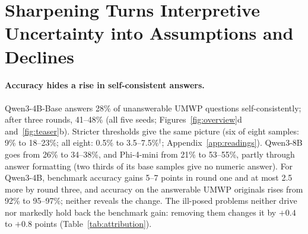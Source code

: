 \section{Sharpening Turns Interpretive Uncertainty into Assumptions and Declines}
\label{sec:accommodation}

\paragraph{Accuracy hides a rise in self-consistent answers.} Qwen3-4B-Base answers 28\% of unanswerable UMWP questions self-consistently; after three rounds, 41--48\% (all five seeds; Figures~\ref{fig:overview}d and~\ref{fig:teaser}b). Stricter thresholds give the same picture (six of eight samples: 9\% to 18--23\%; all eight: 0.5\% to 3.5--7.5\%$^{\dagger}$; Appendix~\ref{app:readings}). Qwen3-8B goes from 26\% to 34--38\%, and Phi-4-mini from 21\% to 53--55\%, partly through answer formatting (two thirds of its base samples give no numeric answer). For Qwen3-4B, benchmark accuracy gains 5--7 points in round one and at most 2.5 more by round three, and accuracy on the answerable UMWP originals rises from 92\% to 95--97\%; neither reveals the change. The ill-posed problems neither drive nor markedly hold back the benchmark gain: removing them changes it by $+0.4$ to $+0.8$ points (Table~\ref{tab:attribution}).

\begin{table}[t]
\centering
\footnotesize
\setlength{\tabcolsep}{2pt}
\caption{Where the self-consistent answers come from (Qwen3-4B, round 3, UMWP). Items: size of the smaller set (seed mean or range) and its change relative to the larger one; other columns: seed-level paired differences in admitted planted premise-deleted problems, self-consistent-answer rate (SC; points; $t$-interval) and accuracy. Same size: one round from the round-2 solver on the solvable admitted problems or an equally large random subset, whose planted deleted problems the next row replaces with other admitted proposals. Last row: a loop admitting a guard-sized random subset of the band (\S\ref{sec:remedies}).}
\label{tab:attribution}
\end{table}

